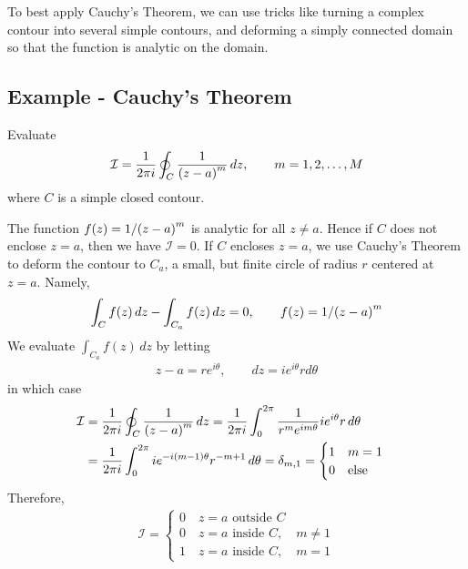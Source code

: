    To best apply Cauchy's Theorem, we can use tricks like turning a complex
    contour into several simple contours, and deforming a simply connected
    domain so that the function is analytic on the domain.

    \subsection{Example - Cauchy's Theorem}
    Evaluate
    \begin{align*}
        \mathcal{I} = \frac{1}{2\pi i} \oint_C \frac{1}{{\left( z-a \right)}^m} \, dz
        , \qquad m = 1, 2, \ldots, M
    \end{align*}
    where $C$ is a simple closed contour.

    The function $f(z) = 1 / {\left( z-a \right)}^m$ is analytic for all $z \neq a$.
    Hence if $C$ does not enclose $z=a$, then we have $\mathcal{I}=0$. If
    $C$ encloses $z=a$, we use Cauchy's Theorem to deform the contour to
    $C_a$, a small, but finite circle of radius $r$ centered at $z=a$.
    Namely,
    \begin{align*}
        \int_C f(z) \, dz - \int_{C_a} f(z) \, dz = 0, \qquad f(z) = 1 / {\left( z-a \right)}^m
    \end{align*}
    We evaluate $\int_{C_a} f(z) \, dz$ by letting
    \begin{align*}
        z - a = r e^{i \theta}, \qquad dz = i e^{i\theta} r d\theta
    \end{align*}
    in which case
    \begin{align*}
        \mathcal{I} &= \frac{1}{2\pi i} \oint_C \frac{1}{{\left( z-a \right)}^m} \, dz
        = \frac{1}{2\pi i} \int_0^{2\pi} \frac{1}{r^m e^{im\theta}} i
        e^{i\theta} r \, d\theta\\
        &= \frac{1}{2\pi i} \int_0^{2\pi} i
        e^{-i{\left( m-1 \right)}\theta}r^{-m+1}\,d\theta = \delta_{m,1} =
        \begin{cases}
            1 \quad m = 1\\
            0 \quad \text{else}
        \end{cases}
    \end{align*}
    Therefore,
    \begin{align*}
        \mathcal{I}=\begin{cases}
            0 \quad z = a \text{ outside } C\\
            0 \quad z = a \text{ inside } C, \quad m \neq 1\\
            1 \quad z = a \text{ inside } C, \quad m = 1
        \end{cases}
    \end{align*}

